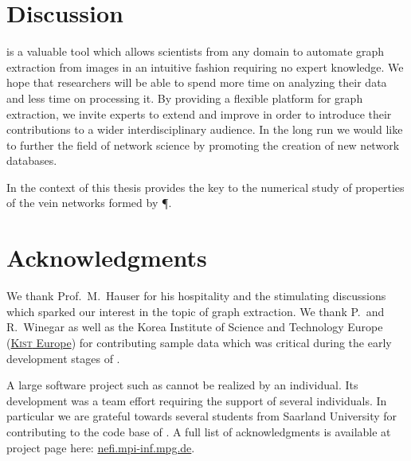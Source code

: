 \section{Discussion}

	\NEFI is a valuable tool which allows scientists from any domain to automate graph extraction from images in an intuitive fashion requiring no expert knowledge. We hope that researchers will be able to spend more time on analyzing their data and less time on processing it. By providing a flexible platform for graph extraction, we invite experts to extend and improve \NEFI in order to introduce their contributions to a wider interdisciplinary audience. In the long run we would like \NEFI to further the field of network science by promoting the creation of new network databases.

	In the context of this thesis \NEFI provides the key to the numerical study of properties of the vein networks formed by \P.

\section{Acknowledgments}

	We thank Prof.~M.~Hauser for his hospitality and the stimulating discussions which sparked our interest in the topic of graph extraction. We thank P.~and R.~Winegar as well as the Korea Institute of Science and Technology Europe (\href{www.kist-europe.de}{\textsc{Kist} Europe}) for contributing sample data which was critical during the early development stages of \NEFI.

	A large software project such as \NEFI cannot be realized by an individual. Its development was a team effort requiring the support of several individuals. In particular we are grateful towards several students from Saarland University for contributing to the code base of \NEFI. A full list of acknowledgments is available at \NEFIs project page here: \href{http://nefi.mpi-inf.mpg.de}{nefi.mpi-inf.mpg.de}.


